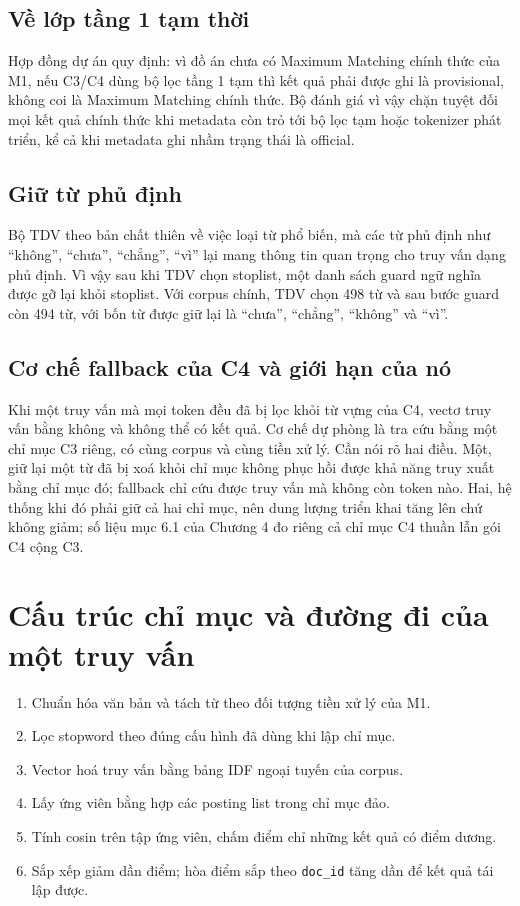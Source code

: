 \subsection{Về lớp tầng 1 tạm thời}

Hợp đồng dự án quy định: vì đồ án chưa có Maximum Matching chính thức của M1, nếu
C3/C4 dùng bộ lọc tầng 1 tạm thì kết quả phải được ghi là provisional, không
coi là Maximum Matching chính thức. Bộ đánh giá vì vậy chặn tuyệt đối mọi kết quả
chính thức khi metadata còn trỏ tới bộ lọc tạm hoặc tokenizer phát triển, kể cả
khi metadata ghi nhầm trạng thái là official.

\subsection{Giữ từ phủ định}

Bộ TDV theo bản chất thiên về việc loại từ phổ biến, mà các từ phủ định như
``không'', ``chưa'', ``chẳng'', ``vì'' lại mang thông tin quan trọng cho truy vấn
dạng phủ định. Vì vậy sau khi TDV chọn stoplist, một danh sách guard ngữ nghĩa
được gỡ lại khỏi stoplist. Với corpus chính, TDV chọn 498 từ và sau bước guard còn
494 từ, với bốn từ được giữ lại là ``chưa'', ``chẳng'', ``không'' và ``vì''.

\subsection{Cơ chế fallback của C4 và giới hạn của nó}

Khi một truy vấn mà mọi token đều đã bị lọc khỏi từ vựng của C4, vectơ truy vấn
bằng không và không thể có kết quả. Cơ chế dự phòng là tra cứu bằng một chỉ mục
C3 riêng, có cùng corpus và cùng tiền xử lý. Cần nói rõ hai điều. Một, giữ lại một
từ đã bị xoá khỏi chỉ mục không phục hồi được khả năng truy xuất bằng chỉ mục đó;
fallback chỉ cứu được truy vấn mà không còn token nào. Hai, hệ thống khi đó phải
giữ cả hai chỉ mục, nên dung lượng triển khai tăng lên chứ không giảm; số liệu
mục 6.1 của Chương 4 đo riêng cả chỉ mục C4 thuần lẫn gói C4 cộng C3.

\section{Cấu trúc chỉ mục và đường đi của một truy vấn}

\begin{enumerate}
\item Chuẩn hóa văn bản và tách từ theo đối tượng tiền xử lý của M1.
\item Lọc stopword theo đúng cấu hình đã dùng khi lập chỉ mục.
\item Vector hoá truy vấn bằng bảng IDF ngoại tuyến của corpus.
\item Lấy ứng viên bằng hợp các posting list trong chỉ mục đảo.
\item Tính cosin trên tập ứng viên, chấm điểm chỉ những kết quả có điểm dương.
\item Sắp xếp giảm dần điểm; hòa điểm sắp theo \texttt{doc\_id} tăng dần để kết
quả tái lập được.
\end{enumerate}

